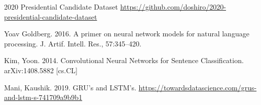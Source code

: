 \documentclass{article}
\begin{document}
\begin{thebibliography}{1}

2020 Presidential Candidate Dataset
\newblock \url{https://github.com/doshiro/2020-presidential-candidate-dataset} 

\newblock Yoav Goldberg. 2016. A primer on neural network
models for natural language processing. J. Artif. Intell. Res., 57:345–420.

Kim, Yoon. 2014. Convolutional Neural Networks for Sentence Classification. arXiv:1408.5882 [cs.CL]

Mani, Kaushik. 2019. GRU's and LSTM's. \url{https://towardsdatascience.com/grus-and-lstm-s-741709a9b9b1}

\end{thebibliography}
\end{document}
